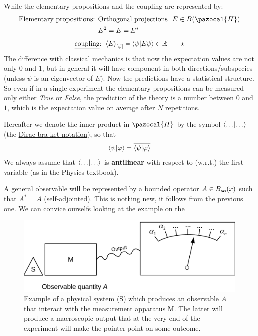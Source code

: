 \documentclass[../main.tex]{subfiles}
\begin{document}
While the elementary propositions and the coupling are represented by:
\begin{align*}
    \textrm{Elementary propositions: }& \textrm{Orthogonal projections } \ E\in B(\pazocal{H})\\
    & E^2=E=E^*
\end{align*}
\[
    \textrm{\underline{coupling}: } \expval{E}_\qty[\psi]=\braket{\psi}{E\psi}\in\mathbb{R} \quad \quad \star
\]
The difference with classical mechanics is that now the expectation values are not only $0$ and $1$, but in general it will have component in both directions/subspecies (unless $\psi$ is an eigenvector of $E$). Now the predictions have a statistical structure. So even if in a single experiment the elementary propositions can be measured only either \textit{True} or \textit{False}, the prediction of the theory is a number between $0$ and $1$, which is the expectation value on average after $N$ repetitions.
\begin{kaobox}[frametitle=Notation]
Hereafter we denote the inner product in $\pazocal{H}$ by the symbol $\braket{\dots}$ (the \href{https://it.wikipedia.org/wiki/Notazione_bra-ket}{Dirac bra-ket notation}), so that
\[
\braket{\psi}{\varphi}=\overline{\braket{\psi}{\varphi}}
\]
We always assume that $\braket{\dots}$ is \textbf{antilinear} with respect to (w.r.t.) the first variable (as in the Physics textbook).

\end{kaobox}
A general observable will be represented by a bounded operator $A\in B_{\textrm{\textbf{sa}}}(x)$ such that $A^*=A$ (self-adjointed). This is nothing new, it follows from the previous one. We can convice ourselfs looking at the example on the 
\begin{figure}[H]
	\includegraphics{images/strumento_misura_osservabile.pdf}
	\caption[Apparatus to measure a quantity]{Example of a physical system (S) which produces an observable $A$ that interact with the measurement apparatus M. The latter will produce a macroscopic output that at the very end of the experiment will make the pointer point on some outcome.}
\end{figure}
\end{document}
